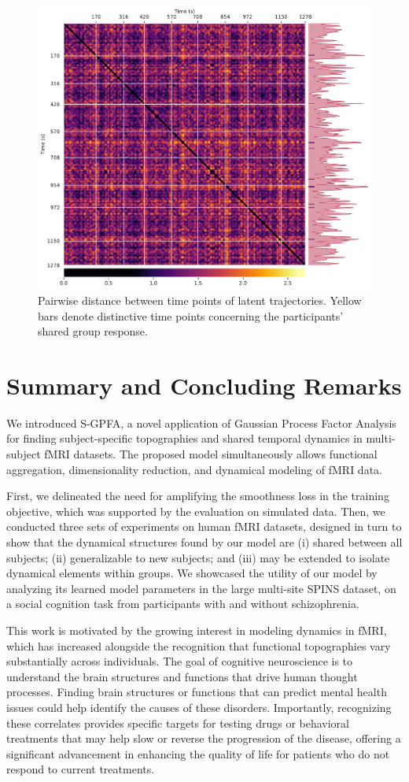 \begin{figure}[h!]
    \centering
    \includegraphics[width=0.8\linewidth]{figs/ch1/dist_time_9.pdf}
    \caption{Pairwise distance between time points of latent trajectories. Yellow bars denote distinctive time points concerning the participants' shared group response.}
    \label{ch1:fig:dist_time}
\end{figure}

\clearpage
\section{Summary and Concluding Remarks}
\label{ch1:sec:conclusion}

We introduced S-GPFA, a novel application of Gaussian Process Factor Analysis for finding subject-specific topographies and shared temporal dynamics in multi-subject fMRI datasets. The proposed model simultaneously allows functional aggregation, dimensionality reduction, and dynamical modeling of fMRI data. 

First, we delineated the need for amplifying the smoothness loss in the training objective, which was supported by the evaluation on simulated data. Then, we conducted three sets of experiments on human fMRI datasets, designed in turn to show that the dynamical structures found by our model are (i) shared between all subjects; (ii) generalizable to new subjects; and (iii) may be extended to isolate dynamical elements within groups. We showcased the utility of our model by analyzing its learned model parameters in the large multi-site SPINS dataset, on a social cognition task from participants with and without schizophrenia.

This work is motivated by the growing interest in modeling dynamics in fMRI, which has increased alongside the recognition that functional topographies vary substantially across individuals. The goal of cognitive neuroscience is to understand the brain structures and functions that drive human thought processes. Finding brain structures or functions that can predict mental health issues could help identify the causes of these disorders. Importantly, recognizing these correlates provides specific targets for testing drugs or behavioral treatments that may help slow or reverse the progression of the disease, offering a significant advancement in enhancing the quality of life for patients who do not respond to current treatments.


